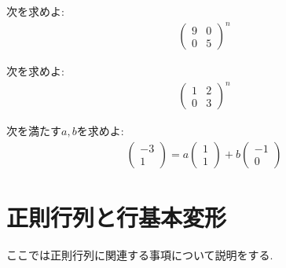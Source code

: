 \begin{quiz}
  次を求めよ:
  \begin{align*}
    \begin{pmatrix}
      9&0\\0&5
    \end{pmatrix}^n
  \end{align*}
\end{quiz}

\begin{quiz}
  次を求めよ:
  \begin{align*}
    \begin{pmatrix}
      1&2\\0&3
    \end{pmatrix}^n
  \end{align*}
\end{quiz}



\begin{quiz}
  次を満たす$a,b$を求めよ:
  \begin{align*}
    \begin{pmatrix}
      -3\\1
    \end{pmatrix}
    =
    a\begin{pmatrix}
      1\\1
    \end{pmatrix}
    +b\begin{pmatrix}
      -1\\0
    \end{pmatrix}
  \end{align*}
\end{quiz}



\chapter{正則行列と行基本変形}
ここでは正則行列に関連する事項について説明をする.

